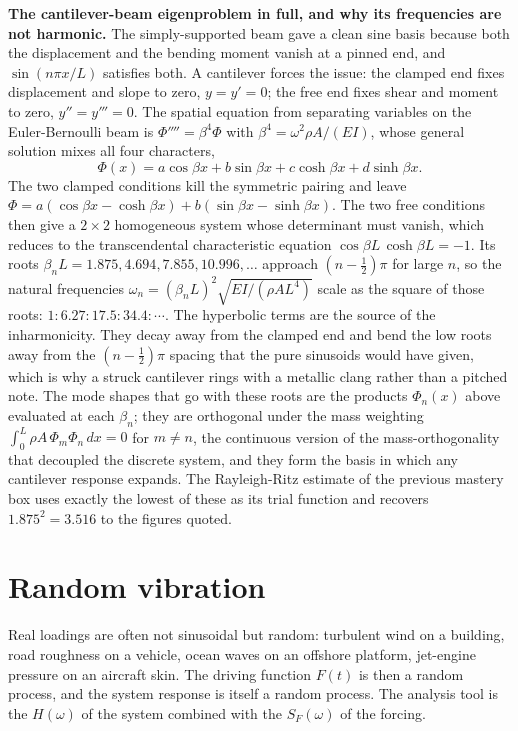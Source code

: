 \begin{mastery}
\textbf{The cantilever-beam eigenproblem in full, and why its
frequencies are not harmonic.} The simply-supported beam gave a clean
sine basis because both the displacement and the bending moment vanish
at a pinned end, and $\sin(n\pi x/L)$ satisfies both. A cantilever
forces the issue: the clamped end fixes displacement and slope to zero,
$y = y' = 0$; the free end fixes shear and moment to zero, $y'' = y''' =
0$. The spatial equation from separating variables on the
Euler-Bernoulli beam is $\Phi'''' = \beta^4\Phi$ with $\beta^4 =
\omega^2\rho A/(EI)$, whose general solution mixes all four characters,
\[
\Phi(x) = a\cos\beta x + b\sin\beta x + c\cosh\beta x + d\sinh\beta x.
\]
The two clamped conditions kill the symmetric pairing and leave $\Phi =
a(\cos\beta x - \cosh\beta x) + b(\sin\beta x - \sinh\beta x)$. The two
free conditions then give a $2\times 2$ homogeneous system whose
determinant must vanish, which reduces to the transcendental
characteristic equation $\cos\beta L\,\cosh\beta L = -1$. Its roots
$\beta_n L = 1.875, 4.694, 7.855, 10.996,\ldots$ approach $(n -
\tfrac12)\pi$ for large $n$, so the natural frequencies $\omega_n =
(\beta_n L)^2\sqrt{EI/(\rho A L^4)}$ scale as the square of those roots:
$1 : 6.27 : 17.5 : 34.4 : \cdots$. The hyperbolic terms are the source
of the inharmonicity. They decay away from the clamped end and bend the
low roots away from the $(n - \tfrac12)\pi$ spacing that the pure
sinusoids would have given, which is why a struck cantilever rings with
a metallic clang rather than a pitched note. The mode shapes that go
with these roots are the products $\Phi_n(x)$ above evaluated at each
$\beta_n$; they are orthogonal under the mass weighting $\int_0^L \rho A
\,\Phi_m\Phi_n\,dx = 0$ for $m\neq n$, the continuous version of the
mass-orthogonality that decoupled the discrete system, and they form
the basis in which any cantilever response expands. The Rayleigh-Ritz
estimate of the previous mastery box uses exactly the lowest of these
as its trial function and recovers $1.875^2 = 3.516$ to the figures
quoted.
\end{mastery}

\section{Random vibration}

Real loadings are often not sinusoidal but random: turbulent wind on
a building, road roughness on a vehicle, ocean waves on an offshore
platform, jet-engine pressure on an aircraft skin. The driving
function $F(t)$ is then a random process, and the system response
is itself a random process. The analysis tool is the
 $H(\omega)$ of the system
combined with the  $S_F(\omega)$ of
the forcing.

